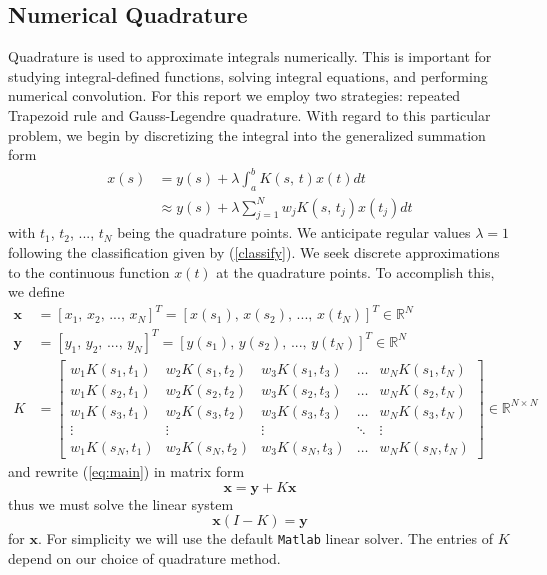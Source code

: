\documentclass[10pt]{article}
\renewcommand{\vec}[1]{\boldsymbol{#1}}
\begin{document}
\begin{description}[wide = 0pt]
\section*{Numerical Quadrature}
Quadrature is used to approximate integrals numerically. This is important for studying integral-defined functions, solving integral equations, and performing numerical convolution. 
For this report we employ two strategies: repeated Trapezoid rule and Gauss-Legendre quadrature. 
With regard to this particular problem, we begin by discretizing the integral into the generalized summation form
\begin{align*}
    x(s) &= y(s) + \lambda \int_a^b K(s, \, t) x(t) dt \\
    &\approx y(s) + \lambda \sum_{j = 1}^N w_j K(s, \, t_j) x(t_j) dt 
\end{align*}
with $t_1$, $t_2$, ..., $t_N$ being the quadrature points. We anticipate regular values $\lambda = 1$ following the classification given by (\ref{classify}). We seek discrete approximations to the continuous function $x(t)$ at the quadrature points. To accomplish this, we define 
\begin{align*}
    \vec{x} &= [x_1, \, x_2, \, ..., \, x_N]^T = [x(s_1), \, x(s_2), \, ..., \, x(t_N)]^T \in \mathbb{R}^N\\
    \vec{y} &= [y_1, \, y_2, \, ..., \, y_N]^T = [y(s_1), \, y(s_2), \, ..., \, y(t_N)]^T  \in \mathbb{R}^N\\[0.3cm]
    K &= \begin{bmatrix}
        w_1K(s_1, t_1) & w_2K(s_1, t_2) & w_3K(s_1, t_3) & \dots  & w_N K(s_1, t_N) \\
        w_1K(s_2, t_1) & w_2K(s_2, t_2) & w_3K(s_2, t_3) & \dots  & w_N K(s_2, t_N) \\
        w_1K(s_3, t_1) & w_2K(s_3, t_2) & w_3K(s_3, t_3) & \dots  & w_N K(s_3, t_N) \\
        \vdots & \vdots & \vdots & \ddots & \vdots \\
        w_1K(s_N, t_1) & w_2K(s_N, t_2) & w_3K(s_N, t_3) & \dots  & w_NK(s_N, t_N)
    \end{bmatrix} \in \mathbb{R}^{N \times N}
\end{align*}
and rewrite (\ref{eq:main}) in matrix form
\begin{equation}
    \vec{x} = \vec{y} + K\vec{x} 
\end{equation}
thus we must solve the linear system
\begin{equation}
    \vec{x} (I - K) = \vec{y} \label{mateq}
\end{equation}
for $\vec{x}$. For simplicity we will use the default \texttt{Matlab} linear solver. The entries of $K$ depend on our choice of quadrature method.


\end{description}
\end{document}
